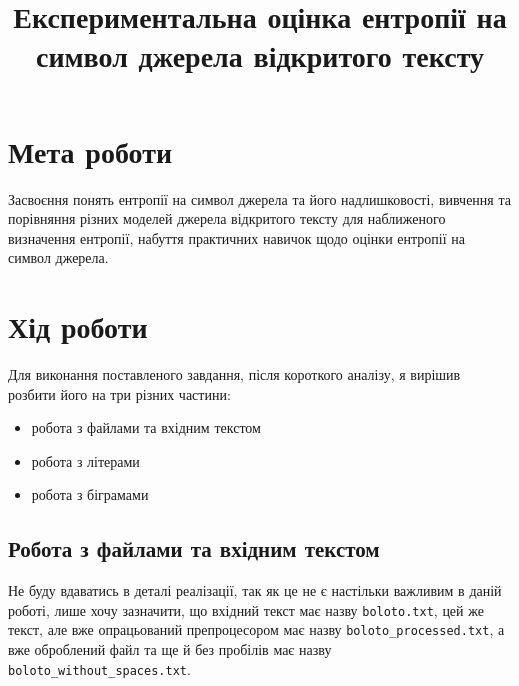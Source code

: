 \documentclass[12pt]{article}
\title{\textbf{Експериментальна оцінка ентропії на символ джерела відкритого тексту}}
\author{}
\date{}
\begin{document}
\maketitle

\section{Мета роботи}
\quad Засвоєння понять ентропії на символ джерела та його надлишковості, вивчення та порівняння різних моделей джерела відкритого тексту для наближеного визначення ентропії, набуття практичних навичок щодо оцінки ентропії на символ джерела.

\section{Хід роботи}
\quad Для виконання поставленого завдання, після короткого аналізу, я вирішив розбити його на три різних частини: 
\begin{itemize}
    \item робота з файлами та вхідним текстом
    \item робота з літерами
    \item робота з біграмами
\end{itemize}

\subsection{Робота з файлами та вхідним текстом}
\quad Не буду вдаватись в деталі реалізації, так як це не є настільки важливим в даній роботі, лише хочу зазначити, що вхідний текст має назву \texttt{boloto.txt}, цей же текст, але вже опрацьований препроцесором має назву \texttt{boloto\_processed.txt}, а вже оброблений файл та ще й без пробілів має назву \texttt{boloto\_without\_spaces.txt}.
\end{document}
